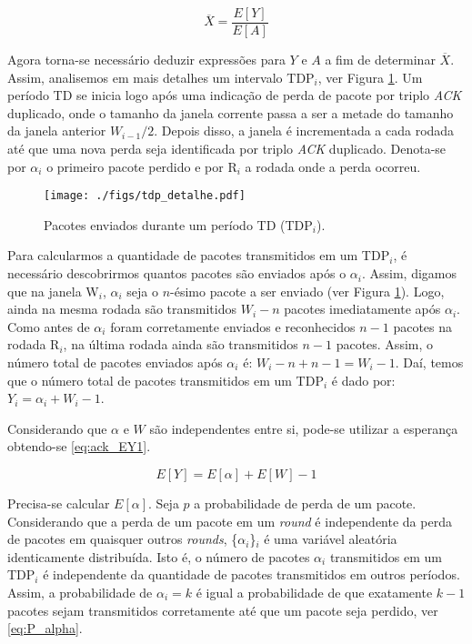 \begin{equation} \label{eq:throughput}
\overline{X}=\frac{E[Y]}{E[A]}
\end{equation}

Agora torna-se necessário deduzir expressões para $Y$ e $A$ a fim de determinar $\overline{X}$. Assim, 
analisemos em mais detalhes um intervalo TDP$_i$, ver Figura \ref{fig:tdp_detalhe}.
Um período TD se inicia logo após uma indicação de perda de pacote por triplo \textit{ACK} duplicado, 
onde o tamanho da janela corrente passa a ser a metade do tamanho da janela anterior $W_{i-1} / 2$. 
Depois disso, a janela é incrementada a cada rodada até que uma nova perda seja identificada por triplo 
\textit{ACK} duplicado. Denota-se por $\alpha_i$ o primeiro pacote perdido e por R$_i$ a rodada onde a 
perda ocorreu. 

\begin{figure}[ht]
  \centering
  \texttt{[image: ./figs/tdp\_detalhe.pdf]}
  \caption{Pacotes enviados durante um período TD (TDP$_{i}$).}
  \label{fig:tdp_detalhe}
\end{figure}

Para calcularmos a quantidade de pacotes transmitidos em um TDP$_i$, é necessário descobrirmos quantos pacotes
são enviados após o $\alpha_i$. Assim, digamos que na janela W$_i$, $\alpha_i$ seja o $n$-ésimo pacote a ser
enviado (ver Figura \ref{fig:tdp_detalhe}). Logo, ainda na mesma rodada  são transmitidos $W_i - n$ pacotes 
imediatamente após $\alpha_i$. Como antes de $\alpha_i$ foram corretamente enviados e reconhecidos $n - 1$ pacotes 
na rodada R$_i$, na última rodada ainda são transmitidos $n - 1$ pacotes. Assim, o número total de pacotes enviados
após $\alpha_i$ é: $W_i - n + n -1 = W_i - 1$. Daí, temos que o número total de pacotes transmitidos em um
TDP$_i$ é dado por: $Y_i = \alpha_i + W_i - 1$. 

Considerando que $\alpha$ e $W$ são independentes entre si,
pode-se utilizar a esperança obtendo-se \eqref{eq:ack_EY1}.

\begin{equation} \label{eq:ack_EY1}
E[Y]=E[\alpha] + E[W] - 1
\end{equation}

Precisa-se calcular $E[\alpha]$. Seja $p$ a probabilidade de perda de um pacote. Considerando que a perda 
de um pacote em um \textit{round} é independente da perda de pacotes em quaisquer outros \textit{rounds}, \{$\alpha_i$\}$_i$ 
é uma variável aleatória identicamente distribuída. Isto é, o número de pacotes $\alpha_i$ transmitidos 
em um TDP$_i$ é independente da quantidade de pacotes transmitidos em outros períodos. Assim, a 
probabilidade de $\alpha_i = k$ é igual a probabilidade de que exatamente $k - 1$ pacotes sejam 
transmitidos corretamente até que um pacote seja perdido, ver \eqref{eq:P_alpha}.

